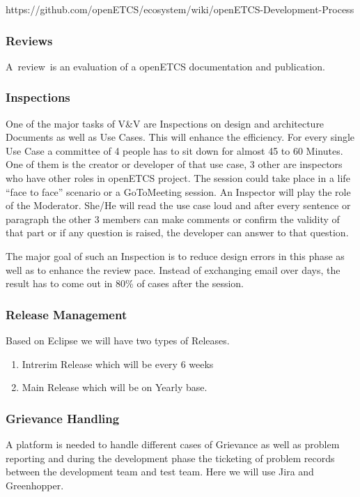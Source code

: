 \documentclass{template/openetcs_article}
\begin{document}
https://github.com/openETCS/ecosystem/wiki/openETCS-Development-Process


\subsubsection{Reviews}
A~review~is an evaluation of a openETCS documentation and publication. 



\subsubsection{Inspections}
One of the major tasks of V\&V are Inspections on design and architecture Documents as well as Use Cases. This will enhance the efficiency. For every single Use Case a committee of 4 people has to sit down for almost 45 to 60 Minutes. One of them is the creator or developer of that use case, 3 other are inspectors who have other roles in openETCS project. The session could take place in a life ``face to face'' scenario or a GoToMeeting session. An Inspector will play the role of the Moderator. She/He will read the use case loud and after every sentence or paragraph the other 3 members can make comments or confirm the validity of that part or if any question is raised, the developer can answer to that question. 


The major goal of such an Inspection is to reduce design errors in this phase as well as to enhance the review pace. Instead of exchanging email over days, the result has to come out in 80\% of cases after the session.  


\subsubsection{Release Management}
Based on Eclipse we will have two types of Releases. 
\begin{enumerate}
\item Intrerim Release which will be every 6 weeks
\item Main Release which will be on Yearly base.
\end{enumerate}


\subsubsection{Grievance Handling}
A platform is needed to handle different cases of Grievance as well as problem reporting and during the development phase the ticketing of problem records between the development team and test team. Here we will use Jira and Greenhopper.
\end{document}
